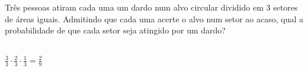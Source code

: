 \begin{ex}
 	Três pessoas atiram cada uma um dardo num alvo circular dividido em 3 setores de áreas iguais. Admitindo que cada uma acerte o alvo num setor ao acaso, qual a probabilidade de que cada setor seja atingido por um dardo?
 	  \begin{sol}
 	    \phantom{A} \\
 	    $\frac{3}{3}\cdot\frac{2}{3}\cdot\frac{1}{3}=\frac{2}{9}$
 	  \end{sol}
\end{ex}